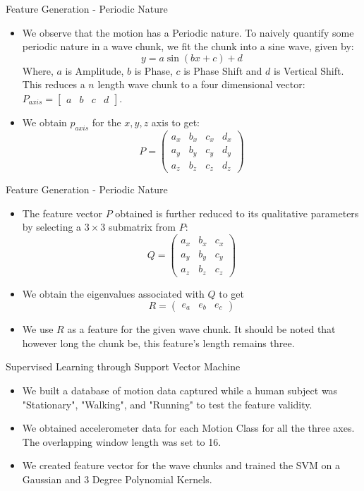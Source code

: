\documentclass{beamer}
\begin{document}
\begin{frame}{Feature Generation - Periodic Nature}
  \begin{itemize}
  \item{
    We observe that the motion has a Periodic nature. To naively quantify some periodic nature in a wave chunk, we fit the chunk into a sine wave, given by:
    $$ y = a\sin(bx + c) + d $$
    Where, $a$ is Amplitude, $b$ is Phase, $c$ is Phase Shift and $d$ is Vertical Shift.
    This reduces a $n$ length wave chunk to a four dimensional vector: $ P_{axis} = [\begin{smallmatrix}a & b & c & d\end{smallmatrix}]$.
  }
  \item{
    We obtain $p_{axis}$ for the $x, y, z$ axis to get:
    $$ P = \begin{pmatrix}
                a_x & b_x & c_x & d_x \\
                a_y & b_y & c_y & d_y \\
                a_z & b_z & c_z & d_z
           \end{pmatrix}$$
  }
  \end{itemize}
\end{frame}
\begin{frame}{Feature Generation - Periodic Nature}
  \begin{itemize}
  \item{
    The feature vector $P$ obtained is further reduced to its qualitative parameters by selecting a $3\times3$ submatrix from $P$:
    $$ Q = \begin{pmatrix}
                a_x & b_x & c_x \\
                a_y & b_y & c_y \\
                a_z & b_z & c_z 
           \end{pmatrix}$$
  }
  \item{
    We obtain the eigenvalues associated with $Q$ to get
    $$ R = \begin{pmatrix}e_a & e_b & e_c\end{pmatrix}
    $$
  }
  \item{
    We use $R$ as a feature for the given wave chunk. It should be noted that however long the chunk be, this feature's length remains three.
  }
  \end{itemize}
\end{frame}
\begin{frame}{Supervised Learning through Support Vector Machine}
  \begin{itemize}
  \item{
    We built a database of motion data captured while a human subject was "Stationary", "Walking", and "Running" to test the feature validity.
  }
  \item{
    We obtained accelerometer data for each Motion Class for all the three axes. The overlapping window length was set to 16.
  }
  \item{
    We created feature vector for the wave chunks and trained the SVM on a Gaussian and 3 Degree Polynomial Kernels.
  }
  \end{itemize}
\end{frame}
\end{document}

